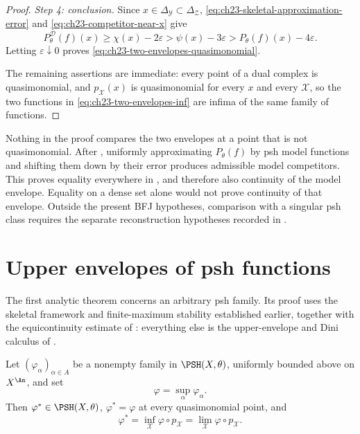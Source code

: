 \begin{proof}
\emph{Step 4: conclusion.}  Since $x\in\Delta_{\mathcal Y}\subset
\Delta_{\mathcal Z}$, \eqref{eq:ch23-skeletal-approximation-error} and
\eqref{eq:ch23-competitor-near-x} give
\[
 P^{\mathcal D}_\theta(f)(x)
 \geq\chi(x)-2\varepsilon
 >\psi(x)-3\varepsilon
 >P_\theta(f)(x)-4\varepsilon .
\]
Letting $\varepsilon\downarrow0$ proves
\eqref{eq:ch23-two-envelopes-quasimonomial}.

The remaining assertions are immediate: every point of a dual complex is
quasimonomial, and $p_{\mathcal X}(x)$ is quasimonomial for every $x$ and
every $\mathcal X$, so the two functions in
\eqref{eq:ch23-two-envelopes-inf} are infima of the same family of
functions.
\end{proof}

\begin{remark}
\label{rem:ch23-two-envelopes-scope}
Nothing in the proof compares the two envelopes at a point that is not
quasimonomial.  After , uniformly approximating
$P_\theta(f)$ by psh model functions and shifting them down by their
error produces admissible model competitors.  This proves equality
everywhere in , and therefore
also continuity of the model envelope.  Equality on a dense set alone
would not prove continuity of that envelope.  Outside the present BFJ
hypotheses, comparison with a singular psh class requires the separate
reconstruction hypotheses recorded in .
\end{remark}

\section{Upper envelopes of psh functions}
\label{sec:ch23-upper-envelopes}

The first analytic theorem concerns an arbitrary psh family.  Its proof
uses the skeletal framework and finite-maximum stability established
earlier, together with the equicontinuity estimate of : everything
else is the upper-envelope and Dini calculus of
.

\begin{theorem}\label{thm:ch23-upper-envelope}
Let $(\varphi_\alpha)_{\alpha\in A}$ be a nonempty family in
$\PSH(X,\theta)$, uniformly bounded above on $X^{\An}$, and set
\begin{equation}\label{eq:ch23-raw-psh-sup}
                         \varphi=\sup_\alpha\varphi_\alpha.
\end{equation}
Then $\varphi^*\in\PSH(X,\theta)$,
$\varphi^*=\varphi$ at every quasimonomial point, and
\begin{equation}\label{eq:ch23-upper-envelope-reconstruction}
 \varphi^*
   =\inf_{\mathcal X}\varphi\circ p_{\mathcal X}
   =\lim_{\mathcal X}\varphi\circ p_{\mathcal X}.
\end{equation}
\end{theorem}

